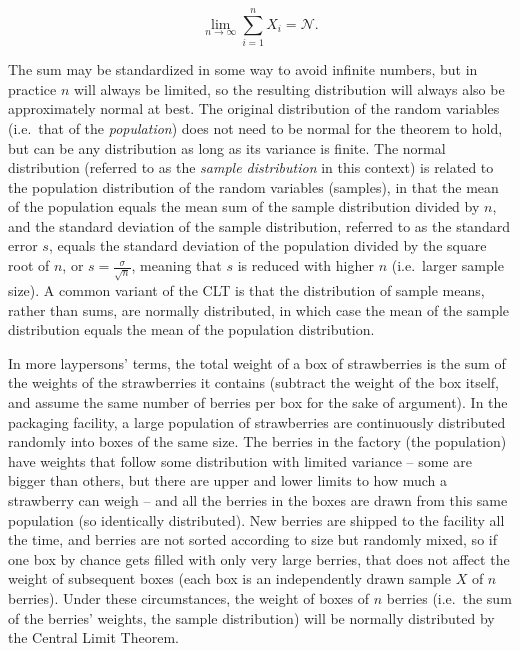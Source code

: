 \documentclass[
  12pt,
]{book}
\begin{document}
\begin{equation}
\lim\limits_{n \to \infty} \sum_{i=1}^n X_i = \mathcal{N}.
\label{eq:CLT}
\end{equation}

The sum may be standardized in some way to avoid infinite numbers, but in practice \(n\) will always be limited, so the resulting distribution will always also be approximately normal at best. The original distribution of the random variables (i.e.~that of the \emph{population}) does not need to be normal for the theorem to hold, but can be any distribution as long as its variance is finite. The normal distribution (referred to as the \emph{sample distribution} in this context) is related to the population distribution of the random variables (samples), in that the mean of the population equals the mean sum of the sample distribution divided by \(n\), and the standard deviation of the sample distribution, referred to as the standard error \(s\), equals the standard deviation of the population divided by the square root of \(n\), or \(s = \frac{\sigma}{\sqrt{n}}\), meaning that \(s\) is reduced with higher \(n\) (i.e.~larger sample size). A common variant of the CLT is that the distribution of sample means, rather than sums, are normally distributed, in which case the mean of the sample distribution equals the mean of the population distribution.

In more laypersons' terms, the total weight of a box of strawberries is the sum of the weights of the strawberries it contains (subtract the weight of the box itself, and assume the same number of berries per box for the sake of argument). In the packaging facility, a large population of strawberries are continuously distributed randomly into boxes of the same size. The berries in the factory (the population) have weights that follow some distribution with limited variance -- some are bigger than others, but there are upper and lower limits to how much a strawberry can weigh -- and all the berries in the boxes are drawn from this same population (so identically distributed). New berries are shipped to the facility all the time, and berries are not sorted according to size but randomly mixed, so if one box by chance gets filled with only very large berries, that does not affect the weight of subsequent boxes (each box is an independently drawn sample \(X\) of \(n\) berries). Under these circumstances, the weight of boxes of \(n\) berries (i.e.~the sum of the berries' weights, the sample distribution) will be normally distributed by the Central Limit Theorem.
\end{document}
